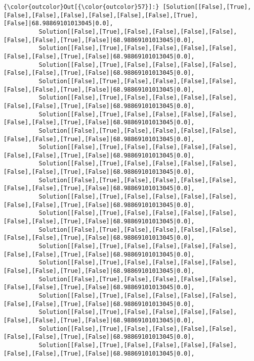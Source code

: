 \documentclass[11pt]{article}
\begin{document}
\begin{Verbatim}[commandchars=\\\{\}]
{\color{outcolor}Out[{\color{outcolor}57}]:} [Solution[[False],[True],[False],[False],[False],[False],[False],[False],[True],[False]|68.98869101013045|0.0],
          Solution[[False],[True],[False],[False],[False],[False],[False],[False],[True],[False]|68.98869101013045|0.0],
          Solution[[False],[True],[False],[False],[False],[False],[False],[False],[True],[False]|68.98869101013045|0.0],
          Solution[[False],[True],[False],[False],[False],[False],[False],[False],[True],[False]|68.98869101013045|0.0],
          Solution[[False],[True],[False],[False],[False],[False],[False],[False],[True],[False]|68.98869101013045|0.0],
          Solution[[False],[True],[False],[False],[False],[False],[False],[False],[True],[False]|68.98869101013045|0.0],
          Solution[[False],[True],[False],[False],[False],[False],[False],[False],[True],[False]|68.98869101013045|0.0],
          Solution[[False],[True],[False],[False],[False],[False],[False],[False],[True],[False]|68.98869101013045|0.0],
          Solution[[False],[True],[False],[False],[False],[False],[False],[False],[True],[False]|68.98869101013045|0.0],
          Solution[[False],[True],[False],[False],[False],[False],[False],[False],[True],[False]|68.98869101013045|0.0],
          Solution[[False],[True],[False],[False],[False],[False],[False],[False],[True],[False]|68.98869101013045|0.0],
          Solution[[False],[True],[False],[False],[False],[False],[False],[False],[True],[False]|68.98869101013045|0.0],
          Solution[[False],[True],[False],[False],[False],[False],[False],[False],[True],[False]|68.98869101013045|0.0],
          Solution[[False],[True],[False],[False],[False],[False],[False],[False],[True],[False]|68.98869101013045|0.0],
          Solution[[False],[True],[False],[False],[False],[False],[False],[False],[True],[False]|68.98869101013045|0.0],
          Solution[[False],[True],[False],[False],[False],[False],[False],[False],[True],[False]|68.98869101013045|0.0],
          Solution[[False],[True],[False],[False],[False],[False],[False],[False],[True],[False]|68.98869101013045|0.0],
          Solution[[False],[True],[False],[False],[False],[False],[False],[False],[True],[False]|68.98869101013045|0.0],
          Solution[[False],[True],[False],[False],[False],[False],[False],[False],[True],[False]|68.98869101013045|0.0],
          Solution[[False],[True],[False],[False],[False],[False],[False],[False],[True],[False]|68.98869101013045|0.0],
          Solution[[False],[True],[False],[False],[False],[False],[False],[False],[True],[False]|68.98869101013045|0.0],

\end{Verbatim}
\end{document}
